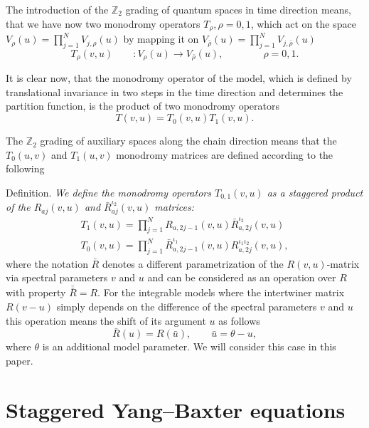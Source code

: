 \documentclass[a4paper,a4paper]{article}
\def\ZZ{{\mathbb Z}}
\newcommand{\nn}{\nonumber}
\begin{document}
The introduction of the $\ZZ_2$ grading of quantum spaces 
in time direction means, 
that we have now two monodromy operators $T_{\rho}, \rho=0,1$,
which act on the space $V_{\rho}(u)=\prod_{j=1}^N V_{j,\rho}(u)$
by mapping it on $V_{\bar{\rho}}(u)=\prod_{j=1}^N V_{j,\bar{\rho}}(u)$
\begin{equation}
\label{T}
T_\rho(v,u) \qquad : V_\rho(u) \rightarrow V_{\bar{\rho}}(u), \qquad \qquad 
\rho=0,1.
\end{equation}

It is clear now, that the monodromy operator of the model, which is defined
by translational invariance in two steps in the time direction and  
determines the partition function, is the product of two monodromy operators
\begin{equation}
\label{TT}
T(v,u) = T_0(v,u) T_1(v,u).
\end{equation}

The $\ZZ_2$ grading of auxiliary spaces along the chain direction means
that the $T_0(u,v)$ and $T_1(u,v)$ monodromy matrices are defined
according to the following
\medskip

\noindent
{\large \sc Definition.} 
\textsl{We define the monodromy operators $T_{0,1}(v,u)$ 
as a staggered product
of the $R_{aj}(v,u)$ and $\bar{R}_{aj}^{\iota_2}(v,u)$ matrices:
\begin{eqnarray}
\label{T1}
T_1(v,u)=\prod_{j=1}^N R_{a,2j-1}(v,u)
\bar{R}_{a,2j}^{\iota_2}(v,u)\nn\\
T_0(v,u)=\prod_{j=1}^N \bar{R}_{a,2j-1}^{\iota_1}(v,u)
R_{a,2j}^{\iota_1 \iota_2}(v,u),
\end{eqnarray}
}
where the notation $\bar{R}$ denotes a 
different parametrization of the $R(v,u)$-matrix via spectral
parameters
$v$ and $u$ and can be considered as an operation
over $R$ with property $\bar{\bar{R}}= R$.
For the integrable models where the intertwiner matrix $R(v-u)$
simply depends
on the difference of the spectral parameters $v$ and $u$ 
this operation means the shift of its argument $u$ as follows
\begin{equation}
\label{RR}
\bar{R}(u)=R(\bar u), \qquad \bar{u}=\theta-u,
\end{equation}
where $\theta$ is an additional model parameter. We will consider
this case in this paper.

\section{Staggered Yang--Baxter equations}
\setcounter{equation}{0}
\end{document}
